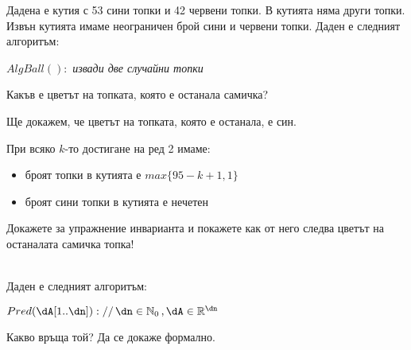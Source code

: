 \begin{problem}\label{prob-balls-in-box}
	Дадена е кутия с 53 сини топки и 42 червени топки. В кутията няма други топки. Извън кутията имаме неограничен брой сини и червени топки. Даден е следният алгоритъм:
	
	\begin{pseudocode}
		
		$AlgBall():$
		\Mybegin
		{
			{
				\emph{извади две случайни топки}\;
			}
		}
	\end{pseudocode}
	Какъв е цветът на топката, която е останала самичка?
\end{problem}

\begin{solution}
	Ще докажем, че цветът на топката, която е останала, е син.
\end{solution}

\begin{boxinvariant*}{}{}
	При всяко $k$-то достигане на ред 2 имаме:
	\begin{itemize}
		\item броят топки в кутията е $max\{95-k+1,1\}$
		\item броят сини топки в кутията е нечетен
	\end{itemize}
\end{boxinvariant*}\leavevmode\newline
Докажете за упражнение инварианта и покажете как от него следва цветът на останалата самичка топка!\\\\

\begin{problem}\label{prob-2-1}
	Даден е следният алгоритъм:
	\begin{pseudocode}
		\SetKwData{dA}{A}
		\SetKwData{dn}{n}
		\SetKwData{dj}{j}
		\SetKwData{di}{i}
		
		$Pred(\dA[1..\dn])://\,\dn\in\mathbb{N}_0\,,\dA\in\mathbb{R}^{\dn}$
		\Mybegin
		{
			\Myfor{$\di\leftarrow1$ \KwTo $\dn-1$}
			{
				\Myfor{$\dj\leftarrow\di+1$ \KwTo $\dn$}
				{
					\If{$\dA[\di]=\dA[\dj]$}{\KwRet{\True\;}}
				}
			}
			\KwRet{\False\;}
		}
	\end{pseudocode}
	Какво връща той? Да се докаже формално.
\end{problem}

